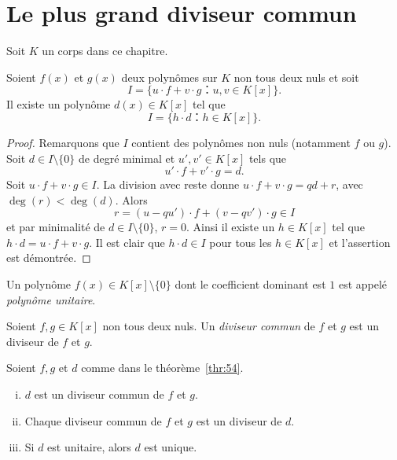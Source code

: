 \section{Le plus grand diviseur commun}
\label{sec:fact-de-polyn}

Soit $K$ un corps dans ce chapitre. 

\begin{theorem}
  \label{thr:54}
  Soient $f(x)$ et $g(x)$ deux polynômes sur $K$ non tous deux nuls et soit 
  \begin{displaymath}
    I = \{ u ⋅ f + v ⋅ g ： u,v ∈ K[x]\}.
  \end{displaymath}
  Il existe un  polynôme $d(x)∈K[x]$ tel que
  \begin{equation}
    \label{eq:51}
    I = \{ h ⋅ d ： h ∈ K[x]\}. 
  \end{equation}
\end{theorem}

\begin{proof}
  Remarquons que $I$ contient des polynômes non nuls (notamment $f$ ou $g$). Soit $d ∈ I \setminus \{0\}$ de degré minimal et $u',v' ∈ K[x]$ tels que
  \begin{displaymath}
    u' ⋅ f + v' ⋅g = d. 
  \end{displaymath}
  Soit $u⋅f + v⋅ g ∈ I$. La division avec reste donne $u⋅f + v⋅ g = qd +r$, avec $\deg(r) < \deg(d)$. Alors
  \begin{displaymath}
    r = (u - qu') ⋅ f + (v - qv') ⋅ g ∈ I
  \end{displaymath}
  et par minimalité de $d ∈ I \setminus\{0\}$, $r=0$. Ainsi il existe un $h∈K[x]$ tel que $h⋅d =  u⋅f + v⋅ g$. Il est clair que $h⋅d ∈I$ pour tous les $h ∈K[x]$ et l'assertion est démontrée.   
\end{proof}


\begin{definition}
  \label{def:54}
  Un polynôme $f(x) ∈ K[x] \setminus \{0\}$  dont le coefficient dominant est $1$ est appelé \emph{polynôme unitaire}. 
\end{definition}


\begin{definition}
  \label{def:55}
  Soient $f,g ∈ K[x]$ non tous deux nuls. Un \emph{diviseur commun} de $f$ et $g$  est un diviseur de $f$ et $g$. 
\end{definition}

\begin{theorem}
  \label{thr:55}
  Soient $f, g$ et $d$  comme dans le  théorème~\ref{thr:54}.
  \begin{enumerate}[i)]
  \item $d$ est un diviseur commun de $f$ et $g$. \label{item:24}
  \item Chaque diviseur commun de $f$ et $g$ est un diviseur de $d$. \label{item:25}
  \item Si $d$ est unitaire, alors $d$ est unique.  \label{item:26}
  \end{enumerate}
\end{theorem}

